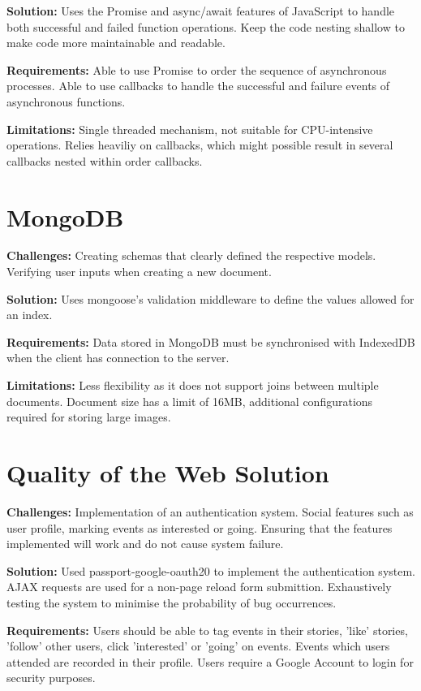\documentclass[11pt, a4paper]{article}
\begin{document}
\textbf{Solution:} Uses the Promise and async/await features of JavaScript to handle both successful
and failed function operations. Keep the code nesting shallow to make code more maintainable and
readable.

\textbf{Requirements:} Able to use Promise to order the sequence of asynchronous processes. Able to
use callbacks to handle the successful and failure events of asynchronous functions.

\textbf{Limitations:} Single threaded mechanism, not suitable for CPU-intensive operations. Relies
heaviliy on callbacks, which might possible result in several callbacks nested within order
callbacks.

\section{MongoDB}
\textbf{Challenges:} Creating schemas that clearly defined the respective models. Verifying user
inputs when creating a new document. 

\textbf{Solution:} Uses mongoose's validation middleware \cite{validation} to define the values
allowed for an index.

\textbf{Requirements:} Data stored in MongoDB must be synchronised with IndexedDB when the client
has connection to the server.

\textbf{Limitations:} Less flexibility as it does not support joins between multiple documents.
Document size has a limit of 16MB, additional configurations required for storing large images.

\section{Quality of the Web Solution}
\textbf{Challenges:} Implementation of an authentication system. Social features such as user
profile, marking events as interested or going. Ensuring that the features implemented will work and
do not cause system failure.

\textbf{Solution:} Used passport-google-oauth20 \cite{passport_google} to implement the
authentication system. AJAX requests are used for a non-page reload form submittion. Exhaustively
testing the system to minimise the probability of bug occurrences.

\textbf{Requirements:} Users should be able to tag events in their stories, 'like' stories, 'follow'
other users, click 'interested' or 'going' on events. Events which users attended are recorded in
their profile. Users require a Google Account to login for security purposes.
\end{document}
